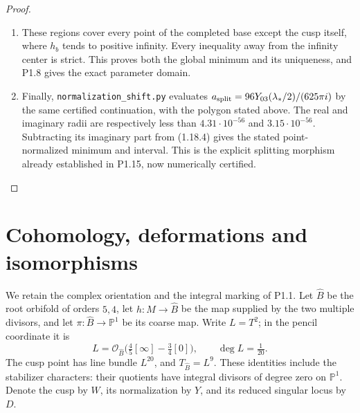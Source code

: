 \documentclass[11pt,a4paper]{article}
\theoremstyle{definition}
\begin{document}
\begin{proof}
\begin{enumerate}[label=\arabic*.]
\item These regions cover every point of the completed base except the
cusp itself, where $h_b$ tends to positive infinity.  Every inequality
away from the infinity center is strict.  This proves both the
global minimum and its uniqueness, and P1.8 gives the exact parameter
domain.

\item Finally, \texttt{normalization\_shift.py} evaluates
$a_{\rm split}=96Y_{03}(\lambda_*/2)/(625\pi i)$ by the same
certified continuation, with the polygon stated above.
The real and imaginary radii are respectively less than
$4.31\cdot10^{-56}$ and $3.15\cdot10^{-56}$.
Subtracting its imaginary part from (1.18.4) gives the stated
point-normalized minimum and interval.  This is the explicit
splitting morphism already established in P1.15, now numerically
certified.

\end{enumerate}
\end{proof}


\section{Cohomology, deformations and isomorphisms}

We retain the complex orientation and the integral marking of P1.1.
Let $\widehat B$ be the root orbifold of orders $5,4$, let
$h:M\to\widehat B$ be the map supplied by the two multiple divisors,
and let $\pi:\widehat B\to\mathbb P^1$ be its coarse map.
Write $L=T^2$; in the pencil coordinate it is
\[
 L=\mathcal O_{\widehat B}\bigl(\tfrac45[\infty]
                  -\tfrac34[0]\bigr),\qquad \deg L=\tfrac1{20}.
\]
The cusp point has line bundle $L^{20}$, and
$T_{\widehat B}=L^9$. These identities include the stabilizer
characters: their quotients have integral divisors of degree zero
on $\mathbb P^1$. Denote the cusp by $W$, its normalization by $Y$,
and its reduced singular locus by $D$.
\end{document}
